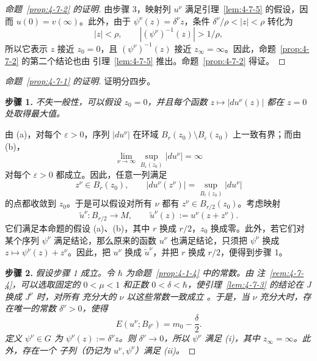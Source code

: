\begin{proof}[命题~\ref{prop:4-7-2} 的证明]
由步骤 3，映射列 $u^\nu$ 满足引理~\ref{lem:4-7-5} 的假设，因而
$u(0)=v(\infty)$。此外，由于 $\psi^\nu(z)=\delta^\nu z$，条件
$\delta^\nu/\rho<|z|<\rho$ 转化为
\[
  |z|<\rho,
  \qquad
  |(\psi^\nu)^{-1}(z)|>1/\rho,
\]
所以它表示 $z$ 接近 $z_0=0$，且 $(\psi^\nu)^{-1}(z)$ 接近
$z_\infty=\infty$。因此，命题~\ref{prop:4-7-2} 的第二个结论也由
引理~\ref{lem:4-7-5} 推出。命题~\ref{prop:4-7-2} 得证。
\end{proof}

\begin{proof}[命题~\ref{prop:4-7-1} 的证明]
证明分四步。

\medskip
\noindent\textbf{步骤 1.}\quad
\emph{不失一般性，可以假设 $z_0=0$，并且每个函数
$z\mapsto|du^\nu(z)|$ 都在 $z=0$ 处取得最大值。}

由 (a)，对每个 $\varepsilon>0$，序列 $|du^\nu|$ 在环域
$B_r(z_0)\setminus B_\varepsilon(z_0)$ 上一致有界；而由 (b)，
\[
  \lim_{\nu\to\infty}\sup_{B_\varepsilon(z_0)}|du^\nu|=\infty
\]
对每个 $\varepsilon>0$ 都成立。因此，任意一列满足
\[
  z^\nu\in B_r(z_0),
  \qquad
  |du^\nu(z^\nu)|=\sup_{B_r(z_0)}|du^\nu|
\]
的点都收敛到 $z_0$。于是可以假设对所有 $\nu$ 都有
$z^\nu\in B_{r/2}(z_0)$。考虑映射
\[
  \widetilde u^\nu:B_{r/2}\to M,
  \qquad
  \widetilde u^\nu(z):=u^\nu(z+z^\nu).
\]
它们满足本命题的假设 (a)、(b)，其中 $r$ 换成 $r/2$，$z_0$ 换成零。此外，若它们对
某个序列 $\psi^\nu$ 满足结论，那么原来的函数 $u^\nu$ 也满足结论，只须把
$\psi^\nu$ 换成 $z\mapsto\psi^\nu(z)+z^\nu$。因此，把 $u^\nu$ 换成
$\widetilde u^\nu$，并把 $r$ 换成 $r/2$，便得到步骤 1。

\medskip
\noindent\textbf{步骤 2.}\quad
\emph{假设步骤 1 成立。令 $\hbar$ 为命题~\ref{prop:4-1-4} 中的常数。由
注~\ref{rem:4-7-4}，可以选取固定的 $0<\mu<1$ 和正数
$0<\delta<\hbar$，使引理~\ref{lem:4-7-3} 的结论在 $J$ 换成 $J^\nu$ 时，对所有
充分大的 $\nu$ 以这些常数一致成立
。于是，当 $\nu$ 充分大时，存在唯一的常数
$\delta^\nu>0$，使得}
\begin{equation}\label{eq:4-7-4}
  E(u^\nu;B_{\delta^\nu})=m_0-\frac\delta2.
\end{equation}
\emph{定义 $\psi^\nu\in G$ 为 $\psi^\nu(z):=\delta^\nu z$。则
$\delta^\nu\to0$，所以 $\psi^\nu$ 满足 (i)，其中 $z_\infty=\infty$。此外，存在一个
子列（仍记为 $u^\nu,\psi^\nu$）满足 (ii)。}


\end{proof}
